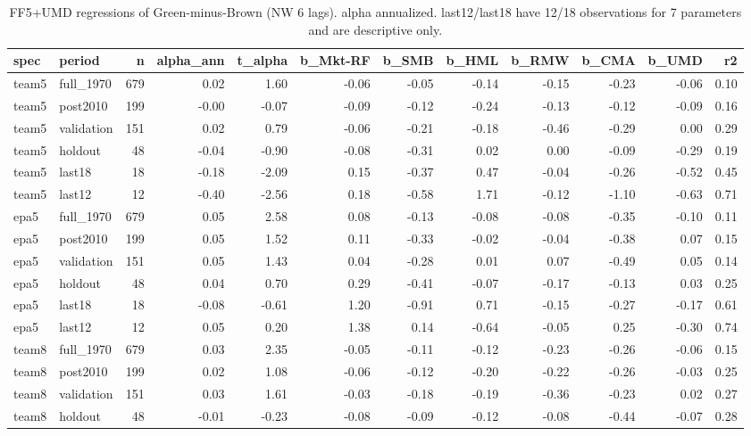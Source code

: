 \begin{table}
\caption{FF5+UMD regressions of Green-minus-Brown (NW 6 lags). alpha annualized. last12/last18 have 12/18 observations for 7 parameters and are descriptive only.}
\label{tab:m4_alphas}
\begin{tabular}{llrrrrrrrrrr}
\toprule
spec & period & n & alpha\_ann & t\_alpha & b\_Mkt-RF & b\_SMB & b\_HML & b\_RMW & b\_CMA & b\_UMD & r2 \\
\midrule
team5 & full\_1970 & 679 & 0.02 & 1.60 & -0.06 & -0.05 & -0.14 & -0.15 & -0.23 & -0.06 & 0.10 \\
team5 & post2010 & 199 & -0.00 & -0.07 & -0.09 & -0.12 & -0.24 & -0.13 & -0.12 & -0.09 & 0.16 \\
team5 & validation & 151 & 0.02 & 0.79 & -0.06 & -0.21 & -0.18 & -0.46 & -0.29 & 0.00 & 0.29 \\
team5 & holdout & 48 & -0.04 & -0.90 & -0.08 & -0.31 & 0.02 & 0.00 & -0.09 & -0.29 & 0.19 \\
team5 & last18 & 18 & -0.18 & -2.09 & 0.15 & -0.37 & 0.47 & -0.04 & -0.26 & -0.52 & 0.45 \\
team5 & last12 & 12 & -0.40 & -2.56 & 0.18 & -0.58 & 1.71 & -0.12 & -1.10 & -0.63 & 0.71 \\
epa5 & full\_1970 & 679 & 0.05 & 2.58 & 0.08 & -0.13 & -0.08 & -0.08 & -0.35 & -0.10 & 0.11 \\
epa5 & post2010 & 199 & 0.05 & 1.52 & 0.11 & -0.33 & -0.02 & -0.04 & -0.38 & 0.07 & 0.15 \\
epa5 & validation & 151 & 0.05 & 1.43 & 0.04 & -0.28 & 0.01 & 0.07 & -0.49 & 0.05 & 0.14 \\
epa5 & holdout & 48 & 0.04 & 0.70 & 0.29 & -0.41 & -0.07 & -0.17 & -0.13 & 0.03 & 0.25 \\
epa5 & last18 & 18 & -0.08 & -0.61 & 1.20 & -0.91 & 0.71 & -0.15 & -0.27 & -0.17 & 0.61 \\
epa5 & last12 & 12 & 0.05 & 0.20 & 1.38 & 0.14 & -0.64 & -0.05 & 0.25 & -0.30 & 0.74 \\
team8 & full\_1970 & 679 & 0.03 & 2.35 & -0.05 & -0.11 & -0.12 & -0.23 & -0.26 & -0.06 & 0.15 \\
team8 & post2010 & 199 & 0.02 & 1.08 & -0.06 & -0.12 & -0.20 & -0.22 & -0.26 & -0.03 & 0.25 \\
team8 & validation & 151 & 0.03 & 1.61 & -0.03 & -0.18 & -0.19 & -0.36 & -0.23 & 0.02 & 0.27 \\
team8 & holdout & 48 & -0.01 & -0.23 & -0.08 & -0.09 & -0.12 & -0.08 & -0.44 & -0.07 & 0.28 \\

\end{tabular}
\end{table}
